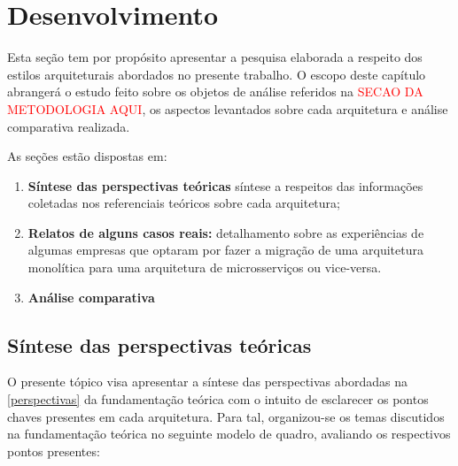\chapter{Desenvolvimento}

Esta seção tem por propósito apresentar a pesquisa elaborada a respeito dos estilos arquiteturais
abordados no presente trabalho. O escopo deste capítulo abrangerá o estudo feito sobre os objetos de
análise referidos na \textcolor{red}{SECAO DA METODOLOGIA AQUI}, os aspectos levantados sobre cada
arquitetura e análise comparativa realizada.

As seções estão dispostas em:

  \begin{enumerate}
    \item \textbf{Síntese das perspectivas teóricas} síntese a respeitos das informações
        coletadas nos referenciais teóricos sobre cada arquitetura;
    \item \textbf{Relatos de alguns casos reais:} detalhamento sobre as experiências de algumas empresas
    que optaram por fazer a migração de uma arquitetura monolítica para uma arquitetura de
    microsserviços ou vice-versa.
    \item \textbf{Análise comparativa}
  \end{enumerate}

\section{Síntese das perspectivas teóricas}

O presente tópico visa apresentar a síntese das perspectivas abordadas na \autoref{perspectivas} da
fundamentação teórica com o intuito de esclarecer os pontos chaves presentes em cada arquitetura.
Para tal, organizou-se os temas discutidos na fundamentação teórica no seguinte modelo de quadro,
avaliando os respectivos pontos presentes:


